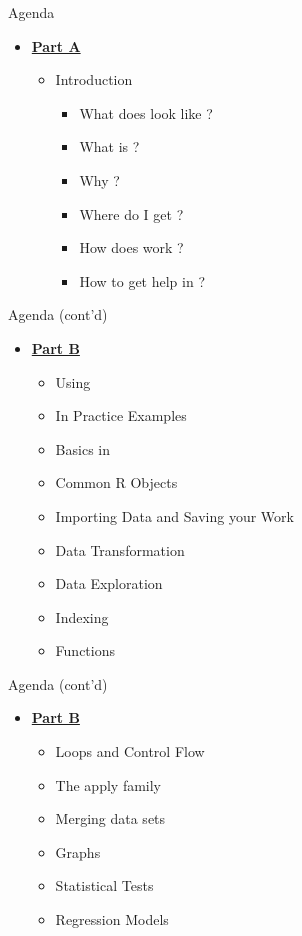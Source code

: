 \documentclass[14pt, aspectratio=169, sectionpage=simple, xclolor=table]{beamer}
\begin{document}
\begin{frame}{Agenda}
\begin{itemize}
\item {\Large \underline{\textbf{Part A}} }
\begin{itemize}
	\item Introduction 
	\begin{itemize}
	\item What does \R look like ?
	\item What is \R ?
	\item Why \R ?
	\item Where do I get \R ?
	\item How does \R work ?
	\item How to get help in \R ?
	\end{itemize}
\end{itemize}
\end{itemize}
\end{frame}
\begin{frame}{Agenda (cont'd)}
\begin{itemize}
\item  {\Large\underline{\textbf{Part B}} }
\begin{itemize}
		\item Using \R
		\item In Practice Examples
		\item Basics in \R
		\item Common R Objects
		\item Importing Data and Saving your Work
	    \item Data Transformation
		\item Data Exploration
		\item Indexing
    	\item Functions
    \end{itemize}
\end{itemize}
\end{frame}
\begin{frame}{Agenda (cont'd)}
\begin{itemize}
	\item {\Large \underline{\textbf{Part B}}}
	\par
	\par
	\begin{itemize}
		\item Loops and Control Flow
		\item The apply family
		\item Merging data sets
		\item Graphs
		\item Statistical Tests
		\item Regression Models
	\end{itemize}
\end{itemize}
\end{frame}
\end{document}
